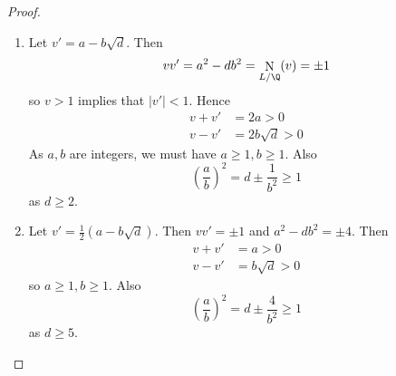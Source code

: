 \documentclass[a4paper]{article}
\DeclareMathOperator{\n}{N}
\begin{document}
\begin{proof}\leavevmode
  \begin{enumerate}
  \item Let \(v' = a - b \sqrt d\). Then
    \[
      vv' = a^2 - db^2 = \n_{L/\Q}(v) = \pm 1
    \]
    so \(v > 1\) implies that \(|v'| < 1\). Hence
    \begin{align*}
      v + v' &= 2a > 0 \\
      v - v' &= 2b \sqrt d > 0
    \end{align*}
    As \(a, b\) are integers, we must have \(a \geq 1, b \geq 1\). Also
    \[
      \left( \frac{a}{b} \right)^2 = d \pm \frac{1}{b^2} \geq 1
    \]
    as \(d \geq 2\).
  \item Let \(v' = \frac{1}{2}(a - b\sqrt d)\). Then \(vv' = \pm 1\) and \(a^2 - db^2 = \pm 4\). Then
    \begin{align*}
      v + v' &= a > 0 \\
      v - v' &= b\sqrt d > 0
    \end{align*}
    so \(a \geq 1, b \geq 1\). Also
    \[
      \left( \frac{a}{b} \right)^2 = d \pm \frac{4}{b^2} \geq 1
    \]
    as \(d \geq 5\).
  \end{enumerate}
\end{proof}
\end{document}
